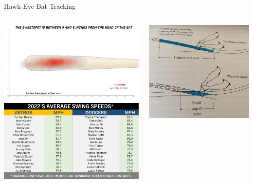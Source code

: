 \documentclass[handout]{beamer}
\begin{document}
\begin{frame}{Hawk-Eye Bat Tracking}
  \begin{columns}
    \begin{column}{0.6\textwidth}
      \includegraphics[width = \textwidth]{images/sweet_spot.jpg}\\
      \pause
      \includegraphics[width = \textwidth]{images/astros_dodgers.jpg}
    \end{column}
    \begin{column}{0.4\textwidth}
      \scriptsize \color{ricerichblue}
      \pause
      \includegraphics[width = \textwidth]{images/ted_williams.jpeg}\\

\end{column}
\end{columns}
\end{frame}
\end{document}
